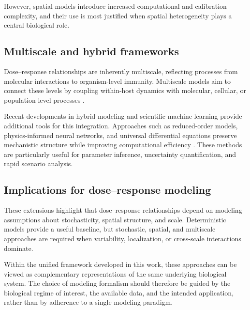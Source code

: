 \documentclass[11pt]{article}
\begin{document}
However, spatial models introduce increased computational and calibration complexity, and their use is most justified when spatial heterogeneity plays a central biological role.

\subsection{Multiscale and hybrid frameworks}

Dose--response relationships are inherently multiscale, reflecting processes from molecular interactions to organism-level immunity. Multiscale models aim to connect these levels by coupling within-host dynamics with molecular, cellular, or population-level processes \cite{Mideo2008WithinHost,Sego2010SpatialInfluenza}. 

Recent developments in hybrid modeling and scientific machine learning provide additional tools for this integration. Approaches such as reduced-order models, physics-informed neural networks, and universal differential equations preserve mechanistic structure while improving computational efficiency \cite{Brunton2022SciML,Karniadakis2021PINNReview,Rackauckas2020UniversalDiffEq}. These methods are particularly useful for parameter inference, uncertainty quantification, and rapid scenario analysis.

\subsection{Implications for dose--response modeling}

These extensions highlight that dose--response relationships depend on modeling assumptions about stochasticity, spatial structure, and scale. Deterministic models provide a useful baseline, but stochastic, spatial, and multiscale approaches are required when variability, localization, or cross-scale interactions dominate.

Within the unified framework developed in this work, these approaches can be viewed as complementary representations of the same underlying biological system. The choice of modeling formalism should therefore be guided by the biological regime of interest, the available data, and the intended application, rather than by adherence to a single modeling paradigm.




\end{document}
